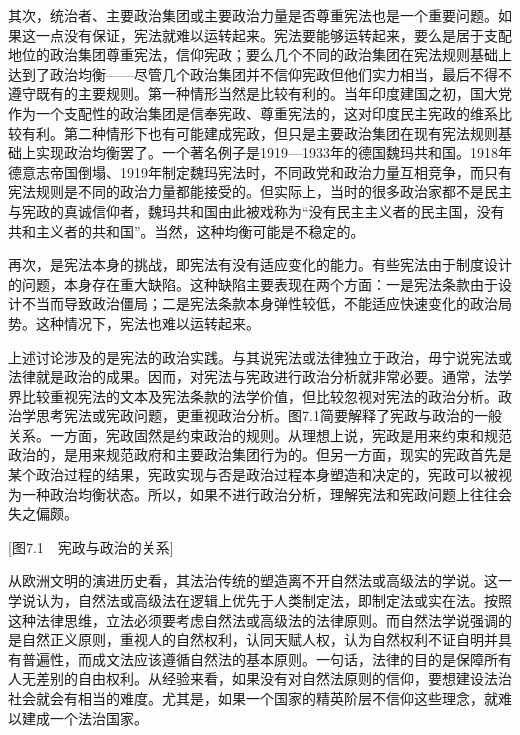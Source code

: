 其次，统治者、主要政治集团或主要政治力量是否尊重宪法也是一个重要问题。如果这一点没有保证，宪法就难以运转起来。宪法要能够运转起来，要么是居于支配地位的政治集团尊重宪法，信仰宪政；要么几个不同的政治集团在宪法规则基础上达到了政治均衡——尽管几个政治集团并不信仰宪政但他们实力相当，最后不得不遵守既有的主要规则。第一种情形当然是比较有利的。当年印度建国之初，国大党作为一个支配性的政治集团是信奉宪政、尊重宪法的，这对印度民主宪政的维系比较有利。第二种情形下也有可能建成宪政，但只是主要政治集团在现有宪法规则基础上实现政治均衡罢了。一个著名例子是1919—1933年的德国魏玛共和国。1918年德意志帝国倒塌、1919年制定魏玛宪法时，不同政党和政治力量互相竞争，而只有宪法规则是不同的政治力量都能接受的。但实际上，当时的很多政治家都不是民主与宪政的真诚信仰者，魏玛共和国由此被戏称为“没有民主主义者的民主国，没有共和主义者的共和国”。当然，这种均衡可能是不稳定的。

再次，是宪法本身的挑战，即宪法有没有适应变化的能力。有些宪法由于制度设计的问题，本身存在重大缺陷。这种缺陷主要表现在两个方面：一是宪法条款由于设计不当而导致政治僵局；二是宪法条款本身弹性较低，不能适应快速变化的政治局势。这种情况下，宪法也难以运转起来。

上述讨论涉及的是宪法的政治实践。与其说宪法或法律独立于政治，毋宁说宪法或法律就是政治的成果。因而，对宪法与宪政进行政治分析就非常必要。通常，法学界比较重视宪法的文本及宪法条款的法学价值，但比较忽视对宪法的政治分析。政治学思考宪法或宪政问题，更重视政治分析。图7.1简要解释了宪政与政治的一般关系。一方面，宪政固然是约束政治的规则。从理想上说，宪政是用来约束和规范政治的，是用来规范政府和主要政治集团行为的。但另一方面，现实的宪政首先是某个政治过程的结果，宪政实现与否是政治过程本身塑造和决定的，宪政可以被视为一种政治均衡状态。所以，如果不进行政治分析，理解宪法和宪政问题上往往会失之偏颇。

[图7.1　宪政与政治的关系]


从欧洲文明的演进历史看，其法治传统的塑造离不开自然法或高级法的学说。这一学说认为，自然法或高级法在逻辑上优先于人类制定法，即制定法或实在法。按照这种法律思维，立法必须要考虑自然法或高级法的法律原则。而自然法学说强调的是自然正义原则，重视人的自然权利，认同天赋人权，认为自然权利不证自明并具有普遍性，而成文法应该遵循自然法的基本原则。一句话，法律的目的是保障所有人无差别的自由权利。从经验来看，如果没有对自然法原则的信仰，要想建设法治社会就会有相当的难度。尤其是，如果一个国家的精英阶层不信仰这些理念，就难以建成一个法治国家。

